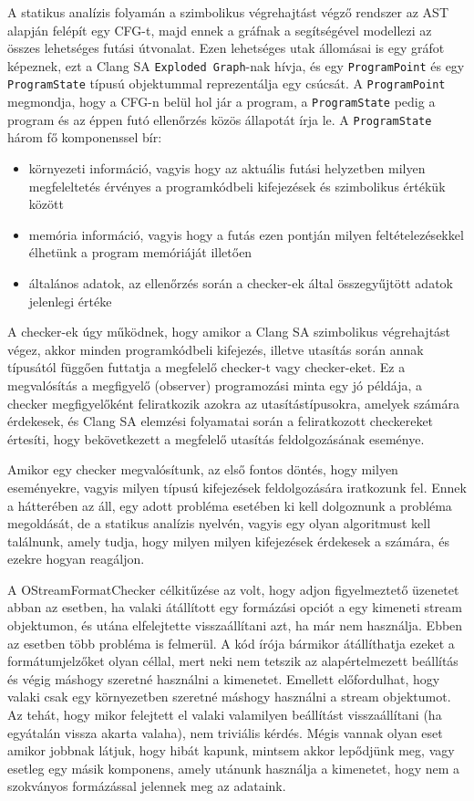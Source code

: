 \documentclass[a4paper,12pt]{report}
\begin{document}
A statikus analízis folyamán a szimbolikus végrehajtást végző rendszer az AST alapján felépít egy CFG-t, majd ennek a gráfnak a segítségével modellezi az összes lehetséges futási útvonalat. Ezen lehetséges utak állomásai is egy gráfot képeznek, ezt a Clang SA \texttt{Exploded Graph}-nak hívja, és egy \texttt{ProgramPoint} és egy \texttt{ProgramState} típusú objektummal reprezentálja egy csúcsát. A \texttt{ProgramPoint} megmondja, hogy a CFG-n belül hol jár a program, a \texttt{ProgramState} pedig a program és az éppen futó ellenőrzés közös állapotát írja le. A \texttt{ProgramState} három fő komponenssel bír:

\begin{itemize}
\item környezeti információ, vagyis hogy az aktuális futási helyzetben milyen megfeleltetés érvényes a programkódbeli kifejezések és szimbolikus értékük között
\item memória információ, vagyis hogy a futás ezen pontján milyen feltételezésekkel élhetünk a program memóriáját illetően
\item általános adatok, az ellenőrzés során a checker-ek által összegyűjtött adatok jelenlegi értéke
\end{itemize}

A checker-ek úgy működnek, hogy amikor a Clang SA szimbolikus végrehajtást végez, akkor minden programkódbeli kifejezés, illetve utasítás során annak típusától függően futtatja a megfelelő checker-t vagy checker-eket. Ez a megvalósítás a megfigyelő (observer) programozási minta egy jó példája, a checker megfigyelőként feliratkozik azokra az utasítástípusokra, amelyek számára érdekesek, és Clang SA elemzési folyamatai során a feliratkozott checkereket értesíti, hogy bekövetkezett a megfelelő utasítás feldolgozásának eseménye.

Amikor egy checker megvalósítunk, az első fontos döntés, hogy milyen eseményekre, vagyis milyen típusú kifejezések feldolgozására iratkozunk fel. Ennek a hátterében az áll, egy adott probléma esetében ki kell dolgoznunk a probléma megoldását, de a statikus analízis nyelvén, vagyis egy olyan algoritmust kell találnunk, amely tudja, hogy milyen milyen kifejezések érdekesek a számára, és ezekre hogyan reagáljon.

A OStreamFormatChecker célkitűzése az volt, hogy adjon figyelmeztető üzenetet abban az esetben, ha valaki átállított egy formázási opciót a egy kimeneti stream objektumon, és utána elfelejtette visszaállítani azt, ha már nem használja. Ebben az esetben több probléma is felmerül. A kód írója bármikor átállíthatja ezeket a formátumjelzőket olyan céllal, mert neki nem tetszik az alapértelmezett beállítás és végig máshogy szeretné használni a kimenetet. Emellett előfordulhat, hogy valaki csak egy környezetben szeretné máshogy használni a stream objektumot. Az tehát, hogy mikor felejtett el valaki valamilyen beállítást visszaállítani (ha egyátalán vissza akarta valaha), nem triviális kérdés. Mégis vannak olyan eset amikor jobbnak látjuk, hogy hibát kapunk, mintsem akkor lepődjünk meg, vagy esetleg egy másik komponens, amely utánunk használja a kimenetet, hogy nem a szokványos formázással jelennek meg az adataink.
\end{document}
